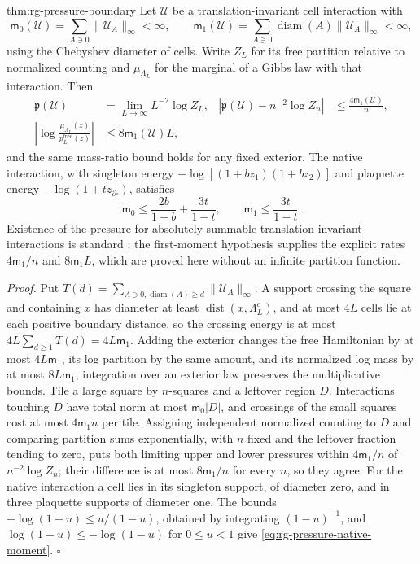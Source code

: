 {thm:rg-pressure-boundary}
Let $\mathscr U$ be a translation-invariant cell interaction with
\begin{equation}
 \mathsf m_0(\mathscr U)=\sum_{A\ni0}\|\mathscr U_A\|_\infty<\infty,\qquad
 \mathsf m_1(\mathscr U)=\sum_{A\ni0}\operatorname{diam}(A)\|\mathscr U_A\|_\infty<\infty,
 \label{eq:rg-pressure-moments}
\end{equation}
using the Chebyshev diameter of cells. Write $Z_L$ for its free partition
relative to normalized counting and $\mu_{\Lambda_L}$ for the marginal of a
Gibbs law with that interaction. Then
\begin{align}
 \mathfrak p(\mathscr U)&=\lim_{L\to\infty}L^{-2}\log Z_L,
 &\left|\mathfrak p(\mathscr U)-n^{-2}\log Z_n\right|&\leq\frac{4\mathsf m_1(\mathscr U)}n,
 \label{eq:rg-pressure-limit}\\
 \left|\log\frac{\mu_{\Lambda_L}(z)}{p_L^{\mathrm{free}}(z)}\right|
 &\leq8\mathsf m_1(\mathscr U)L,
 \label{eq:rg-pressure-surface}
\end{align}
and the same mass-ratio bound holds for any fixed exterior. The native
interaction, with singleton energy $-\log[(1+bz_1)(1+bz_2)]$ and plaquette
energy $-\log(1+tz_{\partial\square})$, satisfies
\begin{equation}
 \mathsf m_0\leq\frac{2b}{1-b}+\frac{3t}{1-t},\qquad
 \mathsf m_1\leq\frac{3t}{1-t}.
 \label{eq:rg-pressure-native-moment}
\end{equation}
Existence of the pressure for absolutely summable translation-invariant
interactions is standard \citep[Chs.~15 and~16]{Georgii1988}; the
first-moment hypothesis supplies the explicit rates $4\mathsf m_1/n$ and
$8\mathsf m_1L$, which are proved here without an infinite partition
function. 

\noindent\emph{Proof.}
Put $T(d)=\sum_{A\ni0,\operatorname{diam}(A)\geq d}\|\mathscr U_A\|_\infty$. A
support crossing the square and containing $x$ has diameter at least
$\operatorname{dist}(x,\Lambda_L^c)$, and at most $4L$ cells lie at each
positive boundary distance, so the crossing energy is at most
$4L\sum_{d\geq1}T(d)=4L\mathsf m_1$. Adding the exterior changes the free
Hamiltonian by at most $4L\mathsf m_1$, its log partition by the same amount,
and its normalized log mass by at most $8L\mathsf m_1$; integration over an
exterior law preserves the multiplicative bounds. Tile a large square by
$n$-squares and a leftover region $D$. Interactions touching $D$ have total
norm at most $\mathsf m_0|D|$, and crossings of the small squares cost at most
$4\mathsf m_1n$ per tile. Assigning independent normalized counting to $D$
and comparing partition sums exponentially, with $n$ fixed and the leftover
fraction tending to zero, puts both limiting upper and lower pressures within
$4\mathsf m_1/n$ of $n^{-2}\log Z_n$; their difference is at most
$8\mathsf m_1/n$ for every $n$, so they agree. For the native interaction a
cell lies in its singleton support, of diameter zero, and in three plaquette
supports of diameter one. The bounds $-\log(1-u)\leq u/(1-u)$, obtained by
integrating $(1-u)^{-1}$, and $\log(1+u)\leq-\log(1-u)$ for $0\leq u<1$ give
\cref{eq:rg-pressure-native-moment}. $\square$

